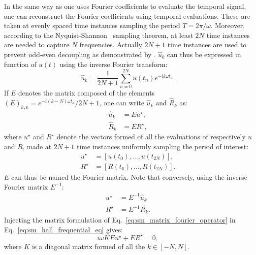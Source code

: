 In the same way as one uses Fourier coefficients to
evaluate the temporal signal,
one can reconstruct the Fourier coefficients using
temporal evaluations. These are taken at evenly spaced time instances
sampling the period $T = 2 \pi / \omega$. Moreover, 
according to the Nyquist-Shannon~\cite{Shannon1949} sampling theorem, 
at least $2N$ time instances are needed to capture $N$ frequencies. Actually
$2N+1$ time instances are used to prevent odd-even decoupling as
demonstrated by \citet{Weide2005}. $\widehat{u}_k$ can thus
be expressed in function of $u(t)$ using the inverse
Fourier transform:
\begin{equation}
	\widehat{u}_k = \frac{1}{2N+1} 
	\sum_{n=0}^{2N} u(t_n) e^{-i k \omega t_n}.
\end{equation}
If $E$ denotes the matrix composed of the elements 
$(E)_{k,n} = e^{-i (k - N) \omega t_n} / 2N+1$, one can write $\widehat{u}_k$
and $\widehat{R}_k$ as:
\begin{equation}
	\begin{split}
		\widehat{u}_k &= E u^\star, \\
		\widehat{R}_k &= E R^\star,
	\end{split}
	\label{eq:sm_matrix_fourier_operator}
\end{equation}
where $u^\star$ and $R^\star$ 
denote the vectors formed of all the evaluations of respectively $u$
and $R$,
made at $2N+1$ time instances uniformly sampling the period of interest:
\begin{equation}
	\begin{split}
		u^\star &= [u(t_0), \ldots, u(t_{2N})], \\
		R^\star &= [R(t_0), \ldots, R(t_{2N})].
	\end{split}
\end{equation}
$E$ can thus be named the Fourier matrix.
Note that conversely, using the inverse Fourier matrix $E^{-1}$:
\begin{equation}
	\begin{split}
		u^\star &= E^{-1} \widehat{u}_k \\
		R^\star &= E^{-1} \widehat{R}_k.
	\end{split}
	\label{eq:sm_sampling_hb_var}
\end{equation}
Injecting the matrix formulation of 
Eq.~\eqref{eq:sm_matrix_fourier_operator} in 
Eq.~\eqref{eq:sm_hall_frequential_eq}
gives:
\begin{equation}
	i \omega K E u^\star + E R^\star = 0,
\end{equation}
where $K$ is a diagonal matrix formed of all the $k \in [-N, N]$.
